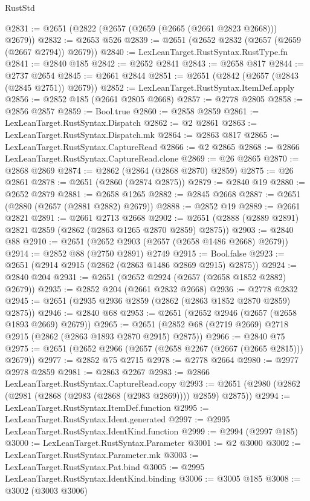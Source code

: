 \begin{lexlean}{RustStd}
\begin{coremodule}
@2831 := @2651 (@2822 (@2657 (@2659 (@2665 (@2661 @2823 @2668))) @2679))
@2832 := @2653 @526
@2839 := @2651 (@2652 @2832 (@2657 (@2659 (@2667 @2794)) @2679))
@2840 := LexLeanTarget.RustSyntax.RustType.fn
@2841 := @2840 @185
@2842 := @2652 @2841
@2843 := @2658 @817
@2844 := @2737 @2654
@2845 := @2661 @2844
@2851 := @2651 (@2842 (@2657 (@2843 (@2845 @2751)) @2679))
@2852 := LexLeanTarget.RustSyntax.ItemDef.apply
@2856 := @2852 @185 (@2661 @2805 @2668)
@2857 := @2778 @2805
@2858 := @2856 @2857
@2859 := Bool.true
@2860 := @2858 @2859
@2861 := LexLeanTarget.RustSyntax.Dispatch
@2862 := @2 @2861
@2863 := LexLeanTarget.RustSyntax.Dispatch.mk
@2864 := @2863 @817
@2865 := LexLeanTarget.RustSyntax.CaptureRead
@2866 := @2 @2865
@2868 := @2866 LexLeanTarget.RustSyntax.CaptureRead.clone
@2869 := @26 @2865
@2870 := @2868 @2869
@2874 := @2862 (@2864 (@2868 @2870) @2859)
@2875 := @26 @2861
@2878 := @2651 (@2860 (@2874 @2875))
@2879 := @2840 @19
@2880 := @2652 @2879
@2881 := @2658 @1265
@2882 := @2845 @2668
@2887 := @2651 (@2880 (@2657 (@2881 @2882) @2679))
@2888 := @2852 @19
@2889 := @2661 @2821
@2891 := @2661 @2713 @2668
@2902 := @2651 (@2888 (@2889 @2891) @2821 @2859 (@2862 (@2863 @1265 @2870 @2859) @2875))
@2903 := @2840 @88
@2910 := @2651 (@2652 @2903 (@2657 (@2658 @1486 @2668) @2679))
@2914 := @2852 @88 (@2750 @2891) @2749
@2915 := Bool.false
@2923 := @2651 (@2914 @2915 (@2862 (@2863 @1486 @2869 @2915) @2875))
@2924 := @2840 @204
@2931 := @2651 (@2652 @2924 (@2657 (@2658 @1852 @2882) @2679))
@2935 := @2852 @204 (@2661 @2832 @2668)
@2936 := @2778 @2832
@2945 := @2651 (@2935 @2936 @2859 (@2862 (@2863 @1852 @2870 @2859) @2875))
@2946 := @2840 @68
@2953 := @2651 (@2652 @2946 (@2657 (@2658 @1893 @2669) @2679))
@2965 := @2651 (@2852 @68 (@2719 @2669) @2718 @2915 (@2862 (@2863 @1893 @2870 @2915) @2875))
@2966 := @2840 @75
@2975 := @2651 (@2652 @2966 (@2657 (@2658 @2267 (@2667 (@2665 @2815))) @2679))
@2977 := @2852 @75 @2715
@2978 := @2778 @2664
@2980 := @2977 @2978 @2859
@2981 := @2863 @2267
@2983 := @2866 LexLeanTarget.RustSyntax.CaptureRead.copy
@2993 := @2651 (@2980 (@2862 (@2981 (@2868 (@2983 (@2868 (@2983 @2869)))) @2859) @2875))
@2994 := LexLeanTarget.RustSyntax.ItemDef.function
@2995 := LexLeanTarget.RustSyntax.Ident.generated
@2997 := @2995 LexLeanTarget.RustSyntax.IdentKind.function
@2999 := @2994 (@2997 @185)
@3000 := LexLeanTarget.RustSyntax.Parameter
@3001 := @2 @3000
@3002 := LexLeanTarget.RustSyntax.Parameter.mk
@3003 := LexLeanTarget.RustSyntax.Pat.bind
@3005 := @2995 LexLeanTarget.RustSyntax.IdentKind.binding
@3006 := @3005 @185
@3008 := @3002 (@3003 @3006)

\end{coremodule}
\end{lexlean}
